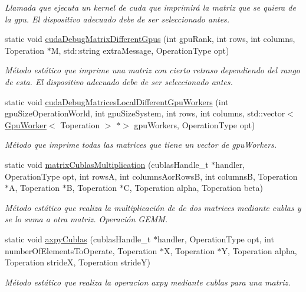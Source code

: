 \begin{DoxyCompactItemize}
\begin{DoxyCompactList}\small\item\em Llamada que ejecuta un kernel de cuda que imprimirá la matriz que se quiera de la gpu. El dispositivo adecuado debe de ser seleccionado antes. \end{DoxyCompactList}\item 
static void \hyperlink{classMatrixUtilitiesCuda_addfcb90ca2f7ab0bae2b3b98a9c30ea1}{cuda\+Debug\+Matrix\+Different\+Gpus} (int gpu\+Rank, int rows, int columns, Toperation $\ast$M, std\+::string extra\+Message, Operation\+Type opt)
\begin{DoxyCompactList}\small\item\em Método estático que imprime una matriz con cierto retraso dependiendo del rango de esta. El dispositivo adecuado debe de ser seleccionado antes. \end{DoxyCompactList}\item 
static void \hyperlink{classMatrixUtilitiesCuda_aa87758d155c939af6bf868b219743a94}{cuda\+Debug\+Matrices\+Local\+Different\+Gpu\+Workers} (int gpu\+Size\+Operation\+World, int gpu\+Size\+System, int rows, int columns, std\+::vector$<$ \hyperlink{classGpuWorker}{Gpu\+Worker}$<$ Toperation $>$ $\ast$$>$ gpu\+Workers, Operation\+Type opt)
\begin{DoxyCompactList}\small\item\em Método que imprime todas las matrices que tiene un vector de gpu\+Workers. \end{DoxyCompactList}\item 
static void \hyperlink{classMatrixUtilitiesCuda_a63d64dbd3297fe359a05c8f83b472a92}{matrix\+Cublas\+Multiplication} (cublas\+Handle\+\_\+t $\ast$handler, Operation\+Type opt, int rowsA, int columns\+Aor\+RowsB, int columnsB, Toperation $\ast$A, Toperation $\ast$B, Toperation $\ast$C, Toperation alpha, Toperation beta)
\begin{DoxyCompactList}\small\item\em Método estático que realiza la multiplicación de de dos matrices mediante cublas y se lo suma a otra matriz. Operación G\+E\+MM. \end{DoxyCompactList}\item 
static void \hyperlink{classMatrixUtilitiesCuda_a8e38e4a56636cf5df0c437d2a2ad3095}{axpy\+Cublas} (cublas\+Handle\+\_\+t $\ast$handler, Operation\+Type opt, int number\+Of\+Elements\+To\+Operate, Toperation $\ast$X, Toperation $\ast$Y, Toperation alpha, Toperation strideX, Toperation strideY)
\begin{DoxyCompactList}\small\item\em Método estático que realiza la operacion axpy mediante cublas para una matriz. \end{DoxyCompactList}\item 
$$
\end{DoxyCompactItemize}
